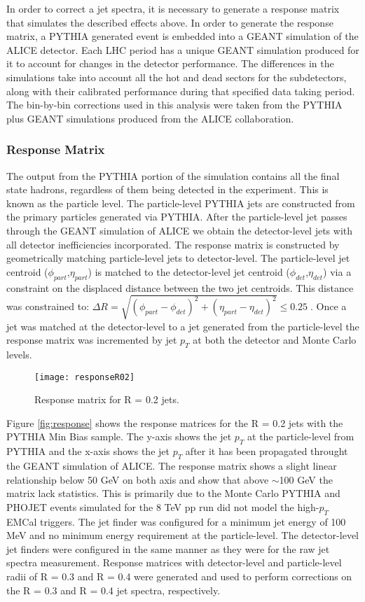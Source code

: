 In order to correct a jet spectra, it is necessary to generate a response matrix that simulates the described effects above.  In order to generate the response matrix, a PYTHIA generated event is embedded into a GEANT simulation of the ALICE detector.  Each LHC period has a unique GEANT simulation produced for it to account for changes in the detector performance.  The differences in the simulations take into account all the hot and dead sectors for the subdetectors, along with their calibrated performance during that specified data taking period.  The bin-by-bin corrections used in this analysis were taken from the PYTHIA plus GEANT simulations produced from the ALICE collaboration.

\subsubsection{Response Matrix}
The output from the PYTHIA portion of the simulation contains all the final state hadrons, regardless of them being detected in the experiment.  This is known as the particle level.  The particle-level PYTHIA jets are constructed from the primary particles generated via PYTHIA.  After the particle-level jet passes through the GEANT simulation of ALICE we obtain the detector-level jets with all detector inefficiencies incorporated.
The response matrix is constructed by geometrically matching particle-level jets to detector-level.  The particle-level jet centroid ($\phi_{part}$,$\eta_{part}$) is matched to the detector-level jet centroid ($\phi_{det}$,$\eta_{det}$) via a constraint on the displaced distance between the two jet centroids.  This distance was constrained to: $\Delta  R = \sqrt{(\phi_{part} - \phi_{det})^{2} + (\eta_{part} - \eta_{det})^{2}} \leq 0.25 \; $.  Once a jet was matched at the detector-level to a jet generated from the particle-level the response matrix was incremented by jet $p_{T}$ at both the detector and Monte Carlo levels.



\begin{figure}[h]
\texttt{[image: responseR02]}
\centering
\caption{Response matrix for R = 0.2 jets.}
\label{fig:rawjetR02}
\end{figure}

Figure \ref{fig:response} shows the response matrices for the R = 0.2 jets with the PYTHIA Min Bias sample.  The y-axis shows the jet $p_{T}$ at the particle-level from PYTHIA and the x-axis shows the jet $p_{T}$ after it has been propagated throught the GEANT simulation of ALICE.  The response matrix shows a slight linear relationship below 50 GeV on both axis and show that above $\sim$100 GeV the matrix lack statistics.  This is primarily due to the Monte Carlo PYTHIA and PHOJET events simulated for the 8 TeV pp run did not model the high-$p_{T}$ EMCal triggers.  The jet finder was configured for a minimum jet energy of 100 MeV and no minimum energy requirement at the particle-level.  The detector-level jet finders were configured in the same manner as they were for the raw jet spectra measurement.  Response matrices with detector-level and particle-level radii of R = 0.3 and R = 0.4 were generated and used to perform corrections on the R = 0.3 and R = 0.4 jet spectra, respectively. 


